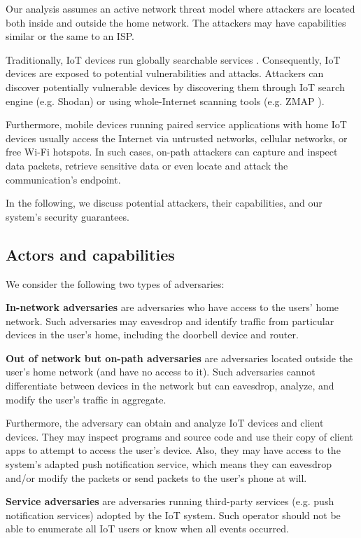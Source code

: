 Our analysis assumes an active network threat model where attackers are located both inside and outside the home network. The attackers may have capabilities similar or the same to an ISP.

Traditionally, IoT devices run globally searchable services \cite{antonakakis2017understanding}. Consequently, IoT devices are exposed to potential vulnerabilities and attacks. Attackers can discover potentially vulnerable devices by discovering them through IoT search engine (e.g. Shodan) or using whole-Internet scanning tools (e.g. ZMAP \cite{wiemer2001software}).

Furthermore, mobile devices running paired service applications with home IoT devices usually access the Internet via untrusted networks, cellular networks, or free Wi-Fi hotspots. In such cases, on-path attackers can capture and inspect data packets, retrieve sensitive data or even locate and attack the communication's endpoint. 

In the following, we discuss potential attackers, their capabilities, and our system's security guarantees.

\subsection{Actors and capabilities}
We consider the following two types of adversaries:

\textbf{In-network adversaries} are adversaries who have access to the users' home network. Such adversaries may eavesdrop and identify traffic from particular devices in the user's home, including the doorbell device and router.


\textbf{Out of network but on-path adversaries} are adversaries located outside the user's home network (and have no access to it). Such adversaries cannot differentiate between devices in the network but can eavesdrop, analyze, and modify the user’s traffic in aggregate. 

Furthermore, the adversary can obtain and analyze IoT devices and client devices. They may inspect programs and source code and use their copy of client apps to attempt to access the user's device. Also, they may have access to the system's adapted push notification service, which means they can eavesdrop and/or modify the packets or send packets to the user's phone at will.

\textbf{Service adversaries} are adversaries running third-party services (e.g. push notification services) adopted by the IoT system. Such operator should not be able to enumerate all IoT users or know when all events occurred.
